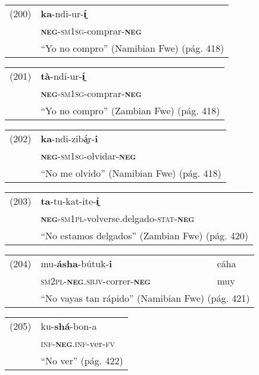 {\setmainfont{Charis SIL} 

\begin{tabular}{ll}
(200) & \textbf{ka}-ndi-ur-\textbf{í̠} \\
& \textsc{\textbf{neg}-sm1sg}-comprar-\textsc{\textbf{neg}}\\
& ``Yo no compro'' (Namibian Fwe) (pág. 418)
\end{tabular} \vspace{0.3cm}

\begin{tabular}{ll}
(201) & \textbf{tà}-ndi-ur-\textbf{í̠} \\
& \textsc{\textbf{neg}-sm1sg}-comprar-\textsc{\textbf{neg}}\\
 & ``Yo no compro'' (Zambian Fwe) (pág. 418)
\end{tabular} \vspace{0.3cm}

\begin{tabular}{ll}
(202) & \textbf{ka}-ndi-zibá̠r-\textbf{i} \\
& \textsc{\textbf{neg}-sm1sg}-olvidar-\textsc{\textbf{neg}}\\
& ``No me olvido'' (Namibian Fwe) (pág. 418)
\end{tabular} \vspace{0.3cm}

\begin{tabular}{ll}
(203) & \textbf{ta}-tu-kat-ite-\textbf{í̠} \\
& \textsc{\textbf{neg}-sm1pl}-volverse.delgado-\textsc{stat-\textbf{neg}} \\
& ``No estamos delgados'' (Zambian Fwe) (pág. 420)
\end{tabular} \vspace{0.3cm}

\begin{tabular}{lll}
(204) & mu-\textbf{ásha}-bútuk-\textbf{i} & cáha \\
& \textsc{sm2pl-\textbf{neg}.sbjv-}correr-\textsc{\textbf{neg}} & muy \\
& \multicolumn{2}{l}{``No vayas tan rápido'' (Namibian Fwe) (pág. 421)}
\end{tabular} \vspace{0.3cm}

\begin{tabular}{ll}
(205) & ku-\textbf{shá}-bon-a  \\
& \textsc{inf-\textbf{neg}.inf}-ver-\textsc{fv} \\
& ``No ver'' (pág. 422)
\end{tabular} \vspace{0.3cm}

}

